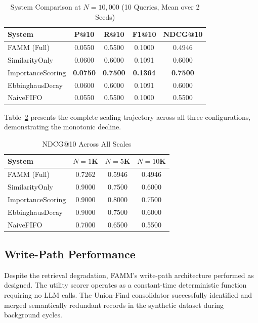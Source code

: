 \documentclass[conference]{IEEEtran}
\begin{document}
\begin{table}[htbp]
\caption{System Comparison at $N{=}10{,}000$ (10 Queries, Mean over 2 Seeds)}
\label{tab:comparison}
\begin{center}
\begin{tabular}{lcccc}
\toprule
\textbf{System} & \textbf{P@10} & \textbf{R@10} & \textbf{F1@10} & \textbf{NDCG@10} \\
\midrule
FAMM (Full) & 0.0550 & 0.5500 & 0.1000 & 0.4946 \\
SimilarityOnly & 0.0600 & 0.6000 & 0.1091 & 0.6000 \\
ImportanceScoring & \textbf{0.0750} & \textbf{0.7500} & \textbf{0.1364} & \textbf{0.7500} \\
EbbinghausDecay & 0.0600 & 0.6000 & 0.1091 & 0.6000 \\
NaiveFIFO & 0.0550 & 0.5500 & 0.1000 & 0.5500 \\
\bottomrule
\end{tabular}
\end{center}
\end{table}

Table~\ref{tab:full_scale} presents the complete scaling trajectory across all three configurations, demonstrating the monotonic decline.

\begin{table}[htbp]
\caption{NDCG@10 Across All Scales}
\label{tab:full_scale}
\begin{center}
\small
\begin{tabular}{lccc}
\toprule
\textbf{System} & \textbf{$N{=}1$K} & \textbf{$N{=}5$K} & \textbf{$N{=}10$K} \\
\midrule
FAMM (Full) & 0.7262 & 0.5946 & 0.4946 \\
SimilarityOnly & 0.9000 & 0.7500 & 0.6000 \\
ImportanceScoring & 0.9000 & 0.8000 & 0.7500 \\
EbbinghausDecay & 0.9000 & 0.7500 & 0.6000 \\
NaiveFIFO & 0.7000 & 0.6500 & 0.5500 \\
\bottomrule
\end{tabular}
\end{center}
\end{table}

\subsection{Write-Path Performance}
Despite the retrieval degradation, FAMM's write-path architecture performed as designed. The utility scorer operates as a constant-time deterministic function requiring no LLM calls. The Union-Find consolidator successfully identified and merged semantically redundant records in the synthetic dataset during background cycles.
\end{document}
